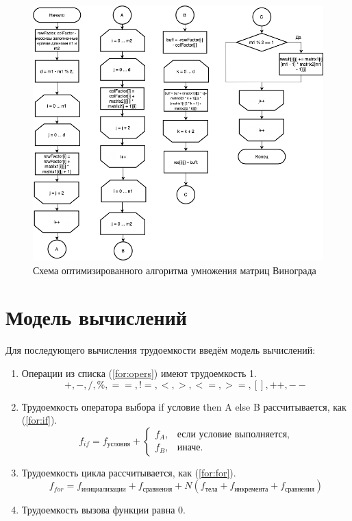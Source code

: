\documentclass[12pt]{report}
\begin{document}
\begin{figure}[h!p]\label{vinOptScheme}
	\centering
	\includegraphics[scale = 0.6]{vinOpt.drawio.png}
	\caption{Схема оптимизированного алгоритма умножения матриц Винограда}
	\label{fig:grapesOpt}
\end{figure}


\section{Модель вычислений}

Для последующего вычисления трудоемкости введём модель вычислений:

\begin{enumerate}
	\item Операции из списка (\ref{for:opers}) имеют трудоемкость 1.
	\begin{equation}
	\label{for:opers}
	+, -, /, \%, ==, !=, <, >, <=, >=, [], ++, {-}-
	\end{equation}
	\item Трудоемкость оператора выбора if условие then A else B рассчитывается, как (\ref{for:if}).
	\begin{equation}
	\label{for:if}
	f_{if} = f_{\text{условия}} +
	\begin{cases}
	f_A, & \text{если условие выполняется,}\\
	f_B, & \text{иначе.}
	\end{cases}
	\end{equation}
	\item Трудоемкость цикла рассчитывается, как (\ref{for:for}).
	\begin{equation}
	\label{for:for}
	f_{for} = f_{\text{инициализации}} + f_{\text{сравнения}} + N(f_{\text{тела}} + f_{\text{инкремента}} + f_{\text{сравнения}})
	\end{equation}
	\item Трудоемкость вызова функции равна 0.
\end{enumerate}
\end{document}
